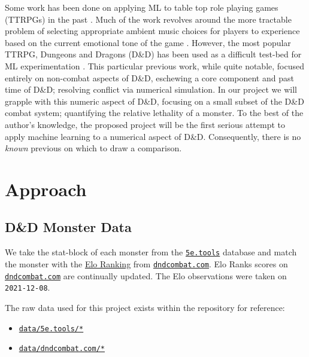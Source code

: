 \documentclass[12pt]{diazessay}
\providecommand{\tightlist}{%
  \setlength{\itemsep}{0pt}\setlength{\parskip}{0pt}}
\begin{document}
Some work has been done on applying ML to table top role playing games (TTRPGs) in the past \cite{rameshkumar-bailey-2020-storytelling, macinnes2019d, cavanaugh2016machine, faria2019adaptive, riedl2013interactive}.
Much of the work revolves around the more tractable problem of selecting appropriate ambient music choices for players to experience based on the current emotional tone of the game \cite{ferreira2017mtg, risi2020increasing, padovani2017bardo, ferreira2020computer}.
However, the most popular TTRPG, Dungeons and Dragons (D\&D) has been used as a difficult test-bed for ML experimentation \cite{martin2018dungeons}.
This particular previous work, while quite notable, focused entirely on non-combat aspects of D\&D, eschewing a core component and past time of D\&D; resolving conflict via numerical simulation.
In our project we will grapple with this numeric aspect of D\&D, focusing on a small subset of the D\&D combat system; quantifying the relative lethality of a monster.
To the best of the author's knowledge, the proposed project will be the first serious attempt to apply machine learning to a numerical aspect of D\&D.
Consequently, there is no \emph{known} previous on which to draw a comparison.


\section{Approach}

\hypertarget{the-dd-monster-data}{%
\subsection{D\&D Monster Data}\label{the-dd-monster-data}}

We take the stat-block of each monster from the
\href{https://5etools-mirror-1.github.io/}{\texttt{5e.tools}} database
and match the monster with the
\href{https://en.wikipedia.org/wiki/Elo_rating_system}{Elo Ranking} from
\href{https://www.dndcombat.com/dndcombat/Welcome.do?page=Compendium}{\texttt{dndcombat.com}}.
Elo Ranks scores on
\href{https://www.dndcombat.com/dndcombat/Welcome.do?page=Compendium}{\texttt{dndcombat.com}}
are continually updated. The Elo observations were taken on
\texttt{2021-12-08}.

The raw data used for this project exists within the repository
for reference:

\begin{itemize}
\tightlist
\item
  \href{https://github.com/recursion-ninja/CSCI-795-ML/tree/main/data/5e.tools}{\texttt{data/5e.tools/*}
  }
\item
  \href{https://github.com/recursion-ninja/CSCI-795-ML/tree/main/data/dndcombat.com}{\texttt{data/dndcombat.com/*}}
\end{itemize}
\end{document}
